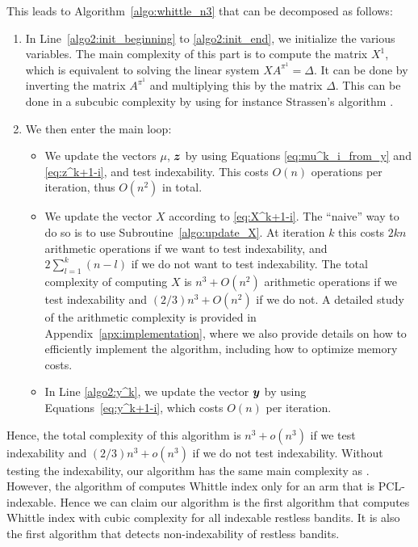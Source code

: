 \documentclass[acmsmall,screen,anonymous]{acmart}
\begin{document}
This leads to Algorithm~\ref{algo:whittle_n3} that can be decomposed as follows:
\begin{enumerate}
    \item In Line~\ref{algo2:init_beginning} to \ref{algo2:init_end}, we initialize the various variables. The main complexity of this part is to compute the matrix $X^1$, which is equivalent to solving the linear system $XA^{\pi^1}=\Delta$. It can be done by inverting the matrix $A^{\pi^1}$ and multiplying this by the matrix $\Delta$. This can be done in a subcubic complexity by using for instance Strassen's algorithm \cite{strassen1969gaussian}.
    \item We then enter the main loop:
        \begin{itemize}
            \item We update the vectors $\mu$, $\boldsymbol{z}$ by using Equations \eqref{eq:mu^k_i_from_y} and \eqref{eq:z^k+1-i}, and test indexability. This costs $O(n)$ operations per iteration, thus $O(n^2)$ in total.
            \item We update the vector $X$ according to \eqref{eq:X^k+1-i}. The ``naive'' way to do so is to use Subroutine~\ref{algo:update_X}. At iteration $k$ this costs $2kn$ arithmetic operations if we want to test indexability, and $2\sum_{l=1}^{k}(n-l)$ if we do not want to test indexability. The total complexity of computing $X$ is $n^3 +O(n^2)$ arithmetic operations if we test indexability and $(2/3)n^3 +O(n^2)$ if we do not.
              A detailed study of the arithmetic complexity is provided in Appendix~\ref{apx:implementation}, where we also provide details on how to efficiently implement the algorithm, including how to optimize memory costs.
            \item In Line \ref{algo2:y^k}, we update the vector $\boldsymbol{y}$ by using Equations~\eqref{eq:y^k+1-i}, which costs $O(n)$ per iteration. 
        \end{itemize}
\end{enumerate}
Hence, the total complexity of this algorithm is $n^3+o(n^3)$ if we test indexability and $(2/3)n^3+o(n^3)$ if we do not test indexability. Without testing the indexability, our algorithm has the same main complexity as \cite{nino2020fast}. However, the algorithm of \cite{nino2020fast} computes Whittle index only for an arm that is PCL-indexable. Hence we can claim our algorithm is the first algorithm that computes Whittle index with cubic complexity for all indexable restless bandits. It is also the first algorithm that detects non-indexability of restless bandits.
\end{document}
